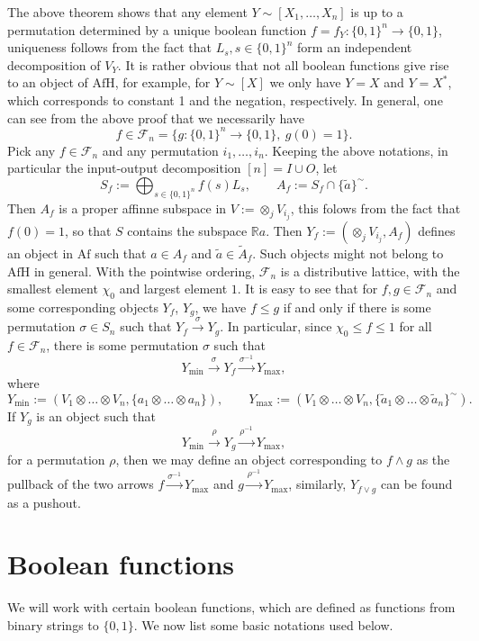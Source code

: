 \documentclass[12pt]{article}
\theoremstyle{definition}
\theoremstyle{remark}
\def\Fe{\mathcal F}
\def \Afh{\mathrm{AfH}}
\def \Af{\mathrm{Af}}
\begin{document}
The above theorem shows that any element $Y\sim[X_1,\dots,X_n]$ is up to a permutation
determined by a unique boolean function $f=f_Y:\{0,1\}^n\to \{0,1\}$, uniqueness follows from
the fact that $L_s, s\in \{0,1\}^n$ form an independent decomposition of $V_Y$.
It is rather obvious that not all boolean functions give rise to an object of $\Afh$, for
example, for $Y\sim [X]$ we only have $Y=X$ and $Y=X^*$, which corresponds to constant
1 and the negation, respectively. In general, one can see from the above proof that we
necessarily have 
\[
f\in \Fe_n=\{g:\{0,1\}^n\to \{0,1\},\ g(0)=1\}.
\]
Pick  any $f\in \Fe_n$ and any permutation $i_1,\dots,i_n$. Keeping the above notations,
in particular the input-output decomposition $[n]=I\cup O$, let 
\[
S_f:=\bigoplus_{s\in \{0,1\}^n} f(s)L_s,\qquad  A_f:=S_f\cap\{\tilde a\}^\sim.
\]
Then $A_f$ is a proper affinne subspace in $V:=\otimes_{j}V_{i_j}$, this folows from the
fact that $f(0)=1$, so that $S$ contains the subspace $\mathbb R a$. 
Then $Y_f:=(\otimes_{j}V_{i_j},A_f)$ defines an object in $\Af$ such that $a\in A_f$ and
$\tilde a\in \tilde A_f$. Such objects might not belong to $\Afh$ in
general.
With the pointwise ordering, $\Fe_n$ is a distributive lattice, with the smallest element
$\chi_0$ and largest element $1$.  It is easy to see that for  $f,g\in \Fe_n$ and some
corresponding objects $Y_f$, $Y_g$, we have $f\le g$  if
and only if there is some permutation $\sigma\in S_n$ such that 
$Y_f\xrightarrow{\sigma} Y_g$. In particular, since $\chi_0\le f\le 1$ for all $f\in
\Fe_n$, there is some permutation $\sigma$ such that 
\[
Y_{\min}\xrightarrow{\sigma} Y_f\xrightarrow{\sigma^{-1}} Y_{\max},
\]
where 
\[
Y_{\min}:=(V_1\otimes\dots\otimes V_n, \{a_1\otimes\dots\otimes a_n\}),\qquad
Y_{\max}:=(V_1\otimes \dots\otimes V_n,\{\tilde a_1\otimes\dots\otimes \tilde a_n\}^\sim).
\]
If $Y_g$ is an object such that 
\[
Y_{\min}\xrightarrow{\rho} Y_g\xrightarrow{\rho^{-1}} Y_{\max},
\]
for a permutation $\rho$, then we may define an object corresponding to $f\wedge g$ as the
pullback of the two arrows $f\xrightarrow{\sigma^{-1}} Y_{\max}$ and
$g\xrightarrow{\rho^{-1}} Y_{\max}$, similarly, $Y_{f\vee g}$ can be found as a pushout.

\section{Boolean functions}



We will work with certain boolean functions, which are defined as  functions from binary
strings to $\{0,1\}$. We now list some basic notations used below.
\end{document}

